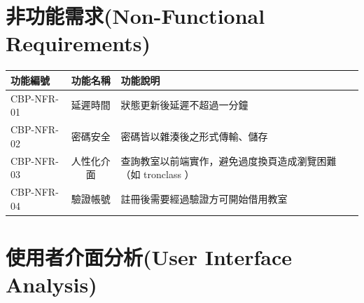 \documentclass{article}
\begin{document}
\section[非功能需求(NON-FUNCTIONAL REQUIREMENTS)]{非功能需求(Non-Functional Requirements)}
\begin{tabularx}{\textwidth}{|l|c|Y|}
	\hline
	功能編號       & 功能名稱  & 功能說明                                 \\ \hline
	CBP-NFR-01 & 延遲時間  & 狀態更新後延遲不超過一分鐘                        \\ \hline
	CBP-NFR-02 & 密碼安全  & 密碼皆以雜湊後之形式傳輸、儲存                      \\ \hline
	CBP-NFR-03 & 人性化介面 & 查詢教室以前端實作，避免過度換頁造成瀏覽困難（如 tronclass ） \\ \hline
	CBP-NFR-04 & 驗證帳號  & 註冊後需要經過驗證方可開始借用教室                    \\ \hline
\end{tabularx}
\newpage

\section[使用者介面分析(USER INTERFACE ANALYSIS)]{使用者介面分析(User Interface Analysis)}
\end{document}
